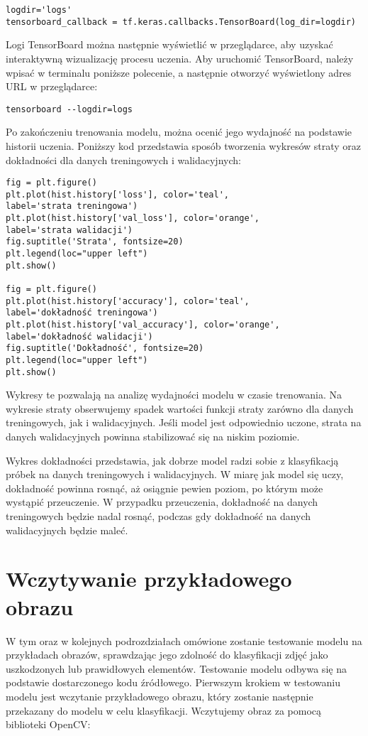\begin{verbatim}
logdir='logs'
tensorboard_callback = tf.keras.callbacks.TensorBoard(log_dir=logdir)
\end{verbatim}

Logi TensorBoard można następnie wyświetlić w przeglądarce, aby uzyskać interaktywną wizualizację procesu uczenia. Aby uruchomić TensorBoard, należy wpisać w terminalu poniższe polecenie, a następnie otworzyć wyświetlony adres URL w przeglądarce:

\begin{verbatim}
tensorboard --logdir=logs
\end{verbatim}

Po zakończeniu trenowania modelu, można ocenić jego wydajność na podstawie historii uczenia. Poniższy kod przedstawia sposób tworzenia wykresów straty oraz dokładności dla danych treningowych i walidacyjnych:

\begin{verbatim}
fig = plt.figure()
plt.plot(hist.history['loss'], color='teal', 
label='strata treningowa')
plt.plot(hist.history['val_loss'], color='orange', 
label='strata walidacji')
fig.suptitle('Strata', fontsize=20)
plt.legend(loc="upper left")
plt.show()

fig = plt.figure()
plt.plot(hist.history['accuracy'], color='teal', 
label='dokładność treningowa')
plt.plot(hist.history['val_accuracy'], color='orange', 
label='dokładność walidacji')
fig.suptitle('Dokładność', fontsize=20)
plt.legend(loc="upper left")
plt.show()
\end{verbatim}

Wykresy te pozwalają na analizę wydajności modelu w czasie trenowania. Na wykresie straty obserwujemy spadek wartości funkcji straty zarówno dla danych treningowych, jak i walidacyjnych. Jeśli model jest odpowiednio uczone, strata na danych walidacyjnych powinna stabilizować się na niskim poziomie.

Wykres dokładności przedstawia, jak dobrze model radzi sobie z klasyfikacją próbek na danych treningowych i walidacyjnych. W miarę jak model się uczy, dokładność powinna rosnąć, aż osiągnie pewien poziom, po którym może wystąpić przeuczenie. W przypadku przeuczenia, dokładność na danych treningowych będzie nadal rosnąć, podczas gdy dokładność na danych walidacyjnych będzie maleć.

\section{Wczytywanie przykładowego obrazu}
W tym oraz w kolejnych podrozdziałach omówione zostanie testowanie modelu na przykładach obrazów, sprawdzając jego zdolność do klasyfikacji zdjęć jako uszkodzonych lub prawidłowych elementów. Testowanie modelu odbywa się na podstawie dostarczonego kodu źródłowego.
Pierwszym krokiem w testowaniu modelu jest wczytanie przykładowego obrazu, który zostanie następnie przekazany do modelu w celu klasyfikacji. Wczytujemy obraz za pomocą biblioteki OpenCV:

